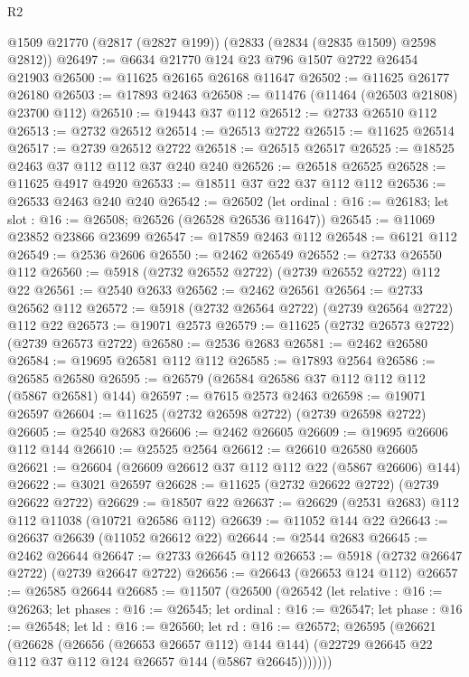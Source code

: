 \begin{lexlean}{R2}
\begin{coremodule}
    @1509
    @21770
    (@2817 (@2827 @199))
    (@2833 (@2834 (@2835 @1509) @2598 @2812))
@26497 := @6634 @21770 @124 @23 @796 @1507 @2722 @26454 @21903
@26500 := @11625 @26165 @26168 @11647
@26502 := @11625 @26177 @26180
@26503 := @17893 @2463
@26508 := @11476 (@11464 (@26503 @21808) @23700 @112)
@26510 := @19443 @37 @112
@26512 := @2733 @26510 @112
@26513 := @2732 @26512
@26514 := @26513 @2722
@26515 := @11625 @26514
@26517 := @2739 @26512 @2722
@26518 := @26515 @26517
@26525 := @18525 @2463 @37 @112 @112 @37 @240 @240
@26526 := @26518 @26525
@26528 := @11625 @4917 @4920
@26533 := @18511 @37 @22 @37 @112 @112
@26536 := @26533 @2463 @240 @240
@26542 := @26502
    (let ordinal : @16 := @26183; let slot : @16 := @26508; @26526 (@26528 @26536 @11647))
@26545 := @11069 @23852 @23866 @23699
@26547 := @17859 @2463 @112
@26548 := @6121 @112
@26549 := @2536 @2606
@26550 := @2462 @26549
@26552 := @2733 @26550 @112
@26560 := @5918 (@2732 @26552 @2722) (@2739 @26552 @2722) @112 @22
@26561 := @2540 @2633
@26562 := @2462 @26561
@26564 := @2733 @26562 @112
@26572 := @5918 (@2732 @26564 @2722) (@2739 @26564 @2722) @112 @22
@26573 := @19071 @2573
@26579 := @11625 (@2732 @26573 @2722) (@2739 @26573 @2722)
@26580 := @2536 @2683
@26581 := @2462 @26580
@26584 := @19695 @26581 @112 @112
@26585 := @17893 @2564
@26586 := @26585 @26580
@26595 := @26579 (@26584 @26586 @37 @112 @112 @112 (@5867 @26581) @144)
@26597 := @7615 @2573 @2463
@26598 := @19071 @26597
@26604 := @11625 (@2732 @26598 @2722) (@2739 @26598 @2722)
@26605 := @2540 @2683
@26606 := @2462 @26605
@26609 := @19695 @26606 @112 @144
@26610 := @25525 @2564
@26612 := @26610 @26580 @26605
@26621 := @26604 (@26609 @26612 @37 @112 @112 @22 (@5867 @26606) @144)
@26622 := @3021 @26597
@26628 := @11625 (@2732 @26622 @2722) (@2739 @26622 @2722)
@26629 := @18507 @22
@26637 := @26629 (@2531 @2683) @112 @112 @11038 (@10721 @26586 @112)
@26639 := @11052 @144 @22
@26643 := @26637 @26639 (@11052 @26612 @22)
@26644 := @2544 @2683
@26645 := @2462 @26644
@26647 := @2733 @26645 @112
@26653 := @5918 (@2732 @26647 @2722) (@2739 @26647 @2722)
@26656 := @26643 (@26653 @124 @112)
@26657 := @26585 @26644
@26685 := @11507
    (@26500
      (@26542
        (let relative : @16 := @26263;
        let phases : @16 := @26545;
        let ordinal : @16 := @26547;
        let phase : @16 := @26548;
        let ld : @16 := @26560;
        let rd : @16 := @26572;
        @26595
          (@26621
            (@26628
              (@26656 (@26653 @26657 @112) @144 @144)
              (@22729 @26645 @22 @112 @37 @112 @124 @26657 @144 (@5867 @26645)))))))

\end{coremodule}
\end{lexlean}
